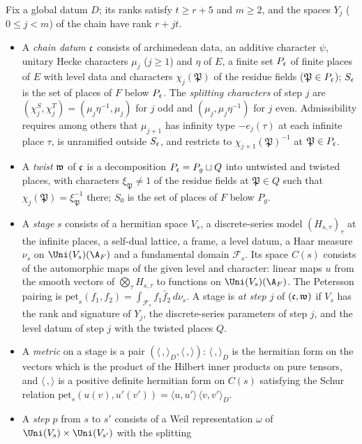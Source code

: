 Fix a global datum $D$; its ranks satisfy $t\ge r+5$ and $m\ge2$, and the spaces $Y_j$ ($0\le j<m$) of the chain have rank $r+jt$.
\begin{itemize}
\item A \emph{chain datum} $\mathfrak c$ consists of archimedean data, an additive character $\psi$, unitary Hecke characters $\mu_j$ ($j\ge1$)
and $\eta$ of $E$, a finite set $P_\mathfrak c$ of finite places of $E$ with level data and characters $\chi_j(\mathfrak P)$ of the residue fields
($\mathfrak P\in P_\mathfrak c$); $S_\mathfrak c$ is the set of places of $F$ below $P_\mathfrak c$. The \emph{splitting characters} of step $j$ are
$(\chi^S_j,\chi^T_j)=(\mu_j\eta^{-1},\mu_j)$ for $j$ odd and $(\mu_j,\mu_j\eta^{-1})$ for $j$ even. Admissibility requires among others
that $\mu_{j+1}$ has infinity type $-e_j(\tau)$ at each infinite place $\tau$, is unramified outside $S_\mathfrak c$, and restricts to
$\chi_{j+1}(\mathfrak P)^{-1}$ at $\mathfrak P\in P_\mathfrak c$.
\item A \emph{twist} $\mathfrak w$ of $\mathfrak c$ is a decomposition $P_\mathfrak c=P_g\sqcup Q$ into untwisted and twisted places, with characters
$\xi_{\mathfrak P}\ne1$ of the residue fields at $\mathfrak P\in Q$ such that $\chi_j(\mathfrak P)=\xi_{\mathfrak P}^{-1}$ there; $S_0$ is the
set of places of $F$ below $P_g$.
\item A \emph{stage} $s$ consists of a hermitian space $V_s$, a discrete-series model $(H_{s,\tau})_\tau$ at the infinite places, a
self-dual lattice, a frame, a level datum, a Haar measure $\nu_s$ on $\Uni(V_s)(\A_F)$ and a fundamental domain $\mathcal F_s$. Its space
$C(s)$ consists of the automorphic maps of the given level and character: linear maps $u$ from the smooth vectors of $\bigotimes_\tau
H_{s,\tau}$ to functions on $\Uni(V_s)(\A_F)$. The Petersson pairing is $\mathrm{pet}_s(f_1,f_2)=\int_{\mathcal F_s}f_1\bar f_2\,d\nu_s$.
A stage is \emph{at step $j$} of $(\mathfrak c,\mathfrak w)$ if $V_s$ has the rank and signature of $Y_j$, the discrete-series parameters of step
$j$, and the level datum of step $j$ with the twisted places $Q$.
\item A \emph{metric} on a stage is a pair $(\langle\,,\rangle_D,\langle\,,\rangle)$: $\langle\,,\rangle_D$ is the hermitian form on the
vectors which is the product of the Hilbert inner products on pure tensors, and $\langle\,,\rangle$ is a positive definite hermitian form
on $C(s)$ satisfying the Schur relation $\mathrm{pet}_s(u(v),u'(v'))=\langle u,u'\rangle\,\langle v,v'\rangle_D$.
\item A \emph{step} $p$ from $s$ to $s'$ consists of a Weil representation $\omega$ of $\Uni(V_s)\times\Uni(V_{s'})$ with the splitting

\end{itemize}
